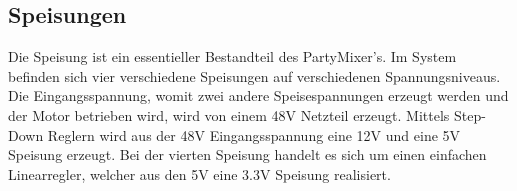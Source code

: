 \subsection{Speisungen}
\label{subsec:Speisungen}

Die Speisung ist ein essentieller Bestandteil des PartyMixer's. Im System befinden sich vier verschiedene Speisungen auf verschiedenen Spannungsniveaus. Die Eingangsspannung, womit zwei andere Speisespannungen erzeugt werden und der Motor betrieben wird, wird von einem 48V Netzteil erzeugt. Mittels Step-Down Reglern wird aus der 48V Eingangsspannung eine 12V und eine 5V Speisung erzeugt. Bei der vierten Speisung handelt es sich um einen einfachen Linearregler, welcher aus den 5V eine 3.3V Speisung realisiert. 
